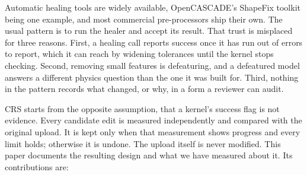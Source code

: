 \documentclass[11pt,onecolumn]{article}
\begin{document}
Automatic healing tools are widely available, OpenCASCADE's ShapeFix toolkit being one example, and
most commercial pre-processors ship their own. The usual pattern is to run the healer and accept its
result. That trust is misplaced for three reasons. First, a healing call reports success once it
has run out of errors to report, which it can reach by widening tolerances until the kernel stops
checking. Second, removing small features is defeaturing, and a defeatured model answers a
different physics question than the one it was built for. Third, nothing in the pattern records
what changed, or why, in a form a reviewer can audit.

CRS starts from the opposite assumption, that a kernel's success flag is not evidence. Every
candidate edit is measured independently and compared with the original upload. It is kept only when
that measurement shows progress and every limit holds; otherwise it is undone. The upload itself is
never modified. This paper documents the resulting design and what we have measured about it. Its
contributions are:
\end{document}
